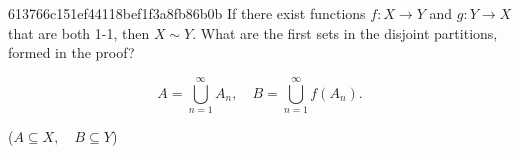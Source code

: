 \begin{note}{613766c151ef44118bef1f3a8fb86b0b}
    If there exist functions \({ f : X \to Y }\) and \({ g : Y \to X }\) that are both 1-1, then \({ X \sim Y }\).
    What are the first sets in the disjoint partitions, formed in the proof?

    \begin{cloze}{1}
        \[
            A = \bigcup_{n=1}^{\infty} A_n, \quad B = \bigcup_{n=1}^{\infty} f(A_n).
        \]

        \begin{center}
            \tiny
            (\({ A \subseteq X, \quad B \subseteq Y }\))
        \end{center}
    \end{cloze}
\end{note}


